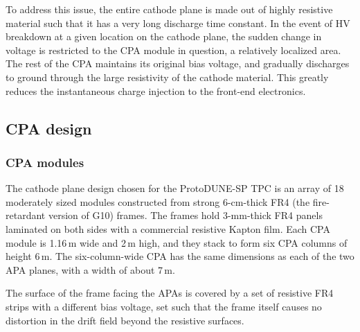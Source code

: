 To address this issue, the entire cathode plane is made out of highly resistive material such that it has a very long discharge time constant.  In the event of HV breakdown at a given location on the cathode plane, the sudden change in voltage is restricted to the CPA module in question, a relatively localized area.  The rest of the CPA maintains its original bias voltage, and gradually discharges to ground through the large resistivity of the cathode material.  This greatly reduces the instantaneous charge injection to the front-end electronics.


\subsection{CPA design}

\subsubsection{CPA modules}


The cathode plane design chosen for the ProtoDUNE-SP TPC is an array of 18 moderately sized modules constructed from strong 6-cm-thick FR4 (the fire-retardant version of G10) frames. The frames hold 3-mm-thick FR4 panels laminated on both sides with a commercial resistive Kapton film.   Each CPA module is 1.16\,m wide and 2\,m high, and they stack to form six CPA columns of height 6\,m.  The six-column-wide CPA has the same dimensions as each of the two APA planes, with a width of about 7\,m.

 The surface of the frame facing the APAs is covered by a set of resistive FR4 strips with a different bias voltage, set such that 
 the frame itself causes no distortion in the drift field beyond the resistive surfaces.


